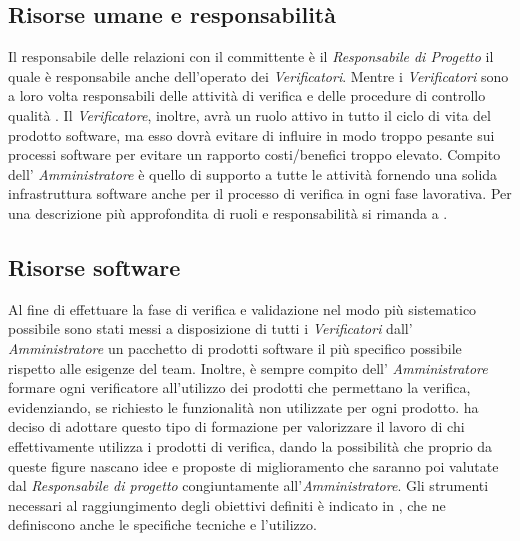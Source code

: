 \subsection{Risorse umane e responsabilità}
Il responsabile delle relazioni con il committente è il \textit{Responsabile di Progetto} il quale è responsabile anche dell'operato dei \textit{Verificatori}. Mentre i \textit{Verificatori} sono a loro volta responsabili delle attività di verifica e delle procedure di controllo qualità . Il \textit{Verificatore}, inoltre, avrà un ruolo attivo in tutto il ciclo di vita del prodotto software, ma esso dovrà evitare di influire in modo troppo pesante sui processi software per evitare un rapporto costi/benefici troppo elevato. Compito dell' \textit{Amministratore} è quello di supporto a tutte le attività fornendo una solida infrastruttura software anche per il processo di verifica in ogni fase lavorativa.
Per una descrizione più approfondita di ruoli e responsabilità si rimanda a \infoNDP.\\
\subsection{Risorse software}
Al fine di effettuare la fase di verifica e validazione nel modo più sistematico possibile sono stati messi a disposizione di tutti i \textit{Verificatori} dall' \textit{Amministratore} un pacchetto di prodotti software il più specifico possibile rispetto alle esigenze del team. Inoltre, è sempre compito dell' \textit{Amministratore} formare ogni verificatore all'utilizzo dei prodotti che permettano la verifica, evidenziando, se richiesto le funzionalità non utilizzate per ogni prodotto. \gruppo{} ha deciso di adottare questo tipo di formazione per valorizzare il lavoro di chi effettivamente utilizza i prodotti di verifica, dando la possibilità che proprio da queste figure nascano idee e proposte di miglioramento che saranno poi valutate dal \textit{Responsabile di progetto} congiuntamente all'\textit{Amministratore}.
Gli strumenti necessari al raggiungimento degli obiettivi definiti è indicato in \infoNDP, che ne definiscono anche le specifiche tecniche e l'utilizzo.
